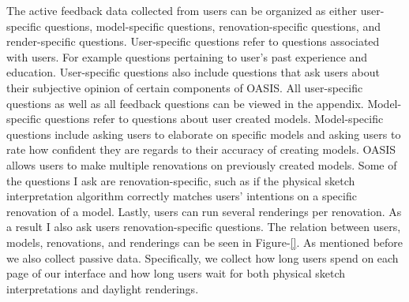 The active feedback data collected from users can be organized as either user-specific questions, model-specific questions, renovation-specific questions, and render-specific questions.
User-specific questions refer to questions associated with users.
For example questions pertaining to user's past experience and education.
User-specific questions also include questions that ask users about their subjective opinion of certain components of OASIS.
All user-specific questions as well as all feedback questions can be viewed in the appendix. 
Model-specific questions refer to questions about user created models.
Model-specific questions include asking users to elaborate on specific models and asking users to rate how confident they are regards to their accuracy of creating models.
OASIS allows users to make multiple renovations on previously created models.
Some of the questions I ask are renovation-specific, such as if the physical sketch interpretation algorithm correctly matches users' intentions on a specific renovation of a model.
Lastly, users can run several renderings per renovation.
As a result I also ask users renovation-specific questions.
The relation between users, models, renovations, and renderings can be seen in Figure-\ref{}.
As mentioned before we also collect passive data.
Specifically, we collect how long users spend on each page of our interface and how long users wait for both physical sketch interpretations and daylight renderings.




